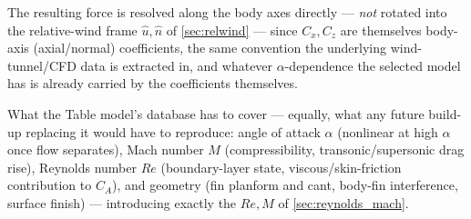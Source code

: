The resulting force is resolved along the body axes directly --- \emph{not} rotated into the
relative-wind frame $\hat{u},\hat{n}$ of \autoref{sec:relwind} --- since $C_x,C_z$ are themselves
body-axis (axial/normal) coefficients, the same convention the underlying wind-tunnel/CFD data is
extracted in, and whatever $\alpha$-dependence the selected model has is already carried by the
coefficients themselves.

What the Table model's database has to cover --- equally, what any future build-up replacing it
would have to reproduce: angle of attack $\alpha$ (nonlinear at high $\alpha$ once flow
separates), Mach number $M$ (compressibility, transonic/supersonic drag rise), Reynolds number
$Re$ (boundary-layer state, viscous/skin-friction contribution to $C_A$), and geometry (fin
planform and cant, body-fin interference, surface finish) --- introducing exactly the $Re,M$ of
\autoref{sec:reynolds_mach}.

